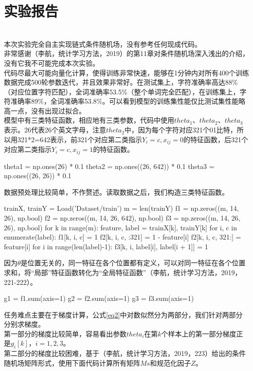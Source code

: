 \documentclass[a4paper,UTF8]{article}
\numberwithin{equation}{section}
\begin{document}
\section {实验报告}
~\\
本次实验完全自主实现链式条件随机场，没有参考任何现成代码。\\
非常感谢（李航，统计学习方法，2019）的第11章对条件随机场深入浅出的介绍，没有它我不可能完成本次实验。\\
代码尽最大可能向量化计算，使得训练非常快速，能够在1分钟内对所有400个训练数据完成500轮参数迭代，并且效果非常好。在测试集上，字符准确率高达88\%（对应位置字符匹配），全词准确率53.5\%（整个单词完全匹配），在训练集上，字符准确率89\%，全词准确率53.8\%。可以看到模型的训练集性能仅比测试集性能略高一点，没有出现过拟合。\\
模型中有三类特征函数，相应地有三类参数，代码中使用$theta_1$、$theta_2$、$theta_3$表示。26代表26个英文字母，注意$theta_2$中，因为每个字符对应321个01比特，所以用321*2=642表示，前321个对应第二类指示$Y_i=c,x_{ij}=0$的特征函数，后321个对应第二类指示$Y_i=c,x_{ij}=1$的特征函数。
\begin{python}
theta1 = np.ones(26) * 0.1
theta2 = np.ones((26, 642)) * 0.1
theta3 = np.ones((26, 26)) * 0.1
\end{python}
数据预处理比较简单，不作赘述。读取数据之后，我们构造三类特征函数。
\begin{python}
trainX, trainY = Load('Dataset/train')
m = len(trainY)
f1 = np.zeros((m, 14, 26), np.bool)
f2 = np.zeros((m, 14, 26, 642), np.bool)
f3 = np.zeros((m, 14, 26, 26), np.bool)
for k in range(m):
    feature, label = trainX[k], trainY[k]
    for i, c in enumerate(label):
        f1[k, i, c] = 1
        f2[k, i, c, :321] = 1 - feature[i]
        f2[k, i, c, 321:] = feature[i]
    for i in range(len(label)-1):
        f3[k, i, label[i], label[i + 1]] = 1
\end{python}
因为$\theta$是位置无关的，同一特征在各个位置都有定义，可以对同一特征在各个位置求和，将“局部”特征函数转化为“全局特征函数”（李航，统计学习方法，2019，221-222）。
\begin{python}
g1 = f1.sum(axis=1)
g2 = f2.sum(axis=1)
g3 = f3.sum(axis=1)
\end{python}
任务难点主要在于梯度计算，公式\eqref{eq2}中对数似然分为两部分，我们针对两部分分别求梯度。\\
第一部分的梯度比较简单，容易看出参数$theta_i$在第$k$个样本上的第一部分梯度正是$g_i[k]$，$i=1,2,3$。\\
第二部分的梯度比较困难，基于（李航，统计学习方法，2019，223）给出的条件随机场矩阵形式，使用下面代码计算所有矩阵$Ms$和规范化因子$Z$。
\end{document}
